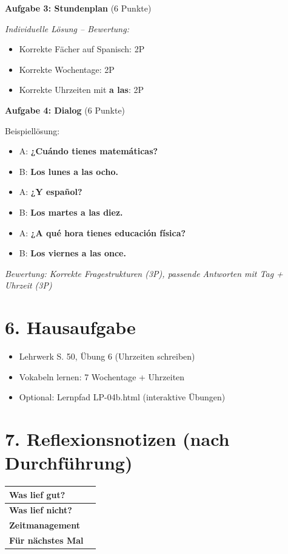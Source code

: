\documentclass[11pt, a4paper]{article}
\newcommand{\fachfarbe}{spanisch}
\newcommand{\sequenz}{04}
\newcommand{\block}{b}
\newcommand{\loesung}[1]{\textcolor{loesung}{\textbf{#1}}}
\newcommand{\es}[1]{\textcolor{\fachfarbe}{\textbf{#1}}}
\begin{document}
\textbf{Aufgabe 3: Stundenplan} (6 Punkte)

\textit{Individuelle Lösung -- Bewertung:}
\begin{itemize}
    \item Korrekte Fächer auf Spanisch: 2P
    \item Korrekte Wochentage: 2P
    \item Korrekte Uhrzeiten mit \es{a las}: 2P
\end{itemize}

\vspace{1em}

\textbf{Aufgabe 4: Dialog} (6 Punkte)

Beispiellösung:
\begin{itemize}
    \item A: \loesung{¿Cuándo tienes matemáticas?}
    \item B: \loesung{Los lunes a las ocho.}
    \item A: \loesung{¿Y español?}
    \item B: \loesung{Los martes a las diez.}
    \item A: \loesung{¿A qué hora tienes educación física?}
    \item B: \loesung{Los viernes a las once.}
\end{itemize}

\textit{Bewertung: Korrekte Fragestrukturen (3P), passende Antworten mit Tag + Uhrzeit (3P)}


\section*{6. Hausaufgabe}

\begin{itemize}
    \item Lehrwerk S. 50, Übung 6 (Uhrzeiten schreiben)
    \item Vokabeln lernen: 7 Wochentage + Uhrzeiten
    \item Optional: Lernpfad LP-\sequenz\block.html (interaktive Übungen)
\end{itemize}


\section*{7. Reflexionsnotizen (nach Durchführung)}

\begin{tabularx}{\textwidth}{|l|X|}
\hline
\textbf{Was lief gut?} & \\[2em]
\hline
\textbf{Was lief nicht?} & \\[2em]
\hline
\textbf{Zeitmanagement} & \\[2em]
\hline
\textbf{Für nächstes Mal} & \\[2em]
\hline
\end{tabularx}
\end{document}
